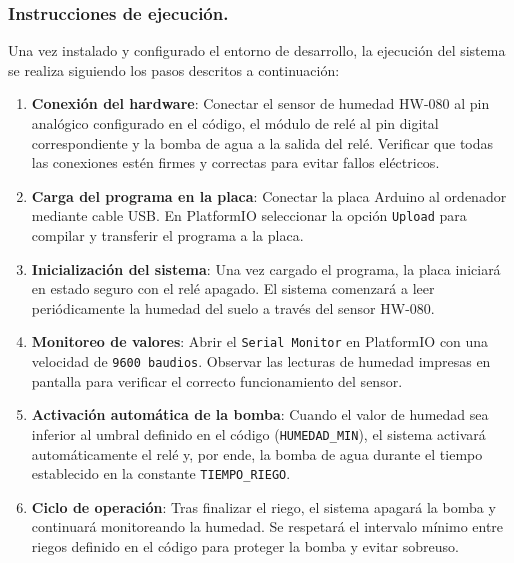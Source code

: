 \documentclass[conference]{IEEEtran}
\begin{document}
\subsubsection{Instrucciones de ejecución.}

Una vez instalado y configurado el entorno de desarrollo, la ejecución del sistema se realiza siguiendo los pasos descritos a continuación:

\begin{enumerate}
    \item \textbf{Conexión del hardware}: 
    Conectar el sensor de humedad HW-080 al pin analógico configurado en el código, 
    el módulo de relé al pin digital correspondiente y la bomba de agua a la salida del relé. 
    Verificar que todas las conexiones estén firmes y correctas para evitar fallos eléctricos.

    \item \textbf{Carga del programa en la placa}: 
    Conectar la placa Arduino al ordenador mediante cable USB. 
    En PlatformIO seleccionar la opción \texttt{Upload} para compilar y transferir el programa a la placa.

    \item \textbf{Inicialización del sistema}: 
    Una vez cargado el programa, la placa iniciará en estado seguro con el relé apagado. 
    El sistema comenzará a leer periódicamente la humedad del suelo a través del sensor HW-080.

    \item \textbf{Monitoreo de valores}: 
    Abrir el \texttt{Serial Monitor} en PlatformIO con una velocidad de \texttt{9600 baudios}. 
    Observar las lecturas de humedad impresas en pantalla para verificar el correcto funcionamiento del sensor.

    \item \textbf{Activación automática de la bomba}: 
    Cuando el valor de humedad sea inferior al umbral definido en el código (\texttt{HUMEDAD\_MIN}), 
    el sistema activará automáticamente el relé y, por ende, la bomba de agua durante el tiempo establecido 
    en la constante \texttt{TIEMPO\_RIEGO}.

    \item \textbf{Ciclo de operación}: 
    Tras finalizar el riego, el sistema apagará la bomba y continuará monitoreando la humedad. 
    Se respetará el intervalo mínimo entre riegos definido en el código para proteger la bomba y evitar sobreuso.
\end{enumerate}
\end{document}
